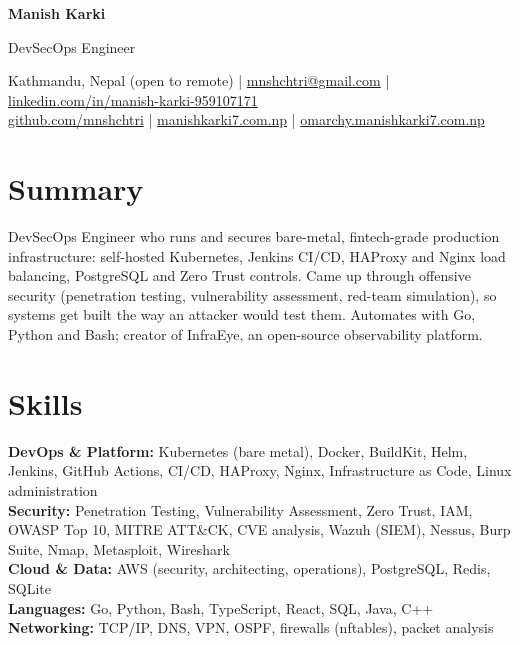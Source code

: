 \documentclass[10pt]{article}
\begin{document}
{\LARGE\bfseries Manish Karki}\par
\vspace{2pt}
{\large DevSecOps Engineer}\par
\vspace{3pt}
{\small Kathmandu, Nepal (open to remote) | \href{mailto:mnshchtri@gmail.com}{mnshchtri@gmail.com} | \href{https://www.linkedin.com/in/manish-karki-959107171/}{linkedin.com/in/manish-karki-959107171}\\
\href{https://github.com/mnshchtri}{github.com/mnshchtri} | \href{https://manishkarki7.com.np}{manishkarki7.com.np} | \href{https://omarchy.manishkarki7.com.np}{omarchy.manishkarki7.com.np}}\par

\section{Summary}
DevSecOps Engineer who runs and secures bare-metal, fintech-grade production infrastructure: self-hosted Kubernetes, Jenkins CI/CD, HAProxy and Nginx load balancing, PostgreSQL and Zero Trust controls. Came up through offensive security (penetration testing, vulnerability assessment, red-team simulation), so systems get built the way an attacker would test them. Automates with Go, Python and Bash; creator of InfraEye, an open-source observability platform.

\section{Skills}
\textbf{DevOps \& Platform:} Kubernetes (bare metal), Docker, BuildKit, Helm, Jenkins, GitHub Actions, CI/CD, HAProxy, Nginx, Infrastructure as Code, Linux administration\\
\textbf{Security:} Penetration Testing, Vulnerability Assessment, Zero Trust, IAM, OWASP Top 10, MITRE ATT\&CK, CVE analysis, Wazuh (SIEM), Nessus, Burp Suite, Nmap, Metasploit, Wireshark\\
\textbf{Cloud \& Data:} AWS (security, architecting, operations), PostgreSQL, Redis, SQLite\\
\textbf{Languages:} Go, Python, Bash, TypeScript, React, SQL, Java, C++\\
\textbf{Networking:} TCP/IP, DNS, VPN, OSPF, firewalls (nftables), packet analysis
\end{document}
